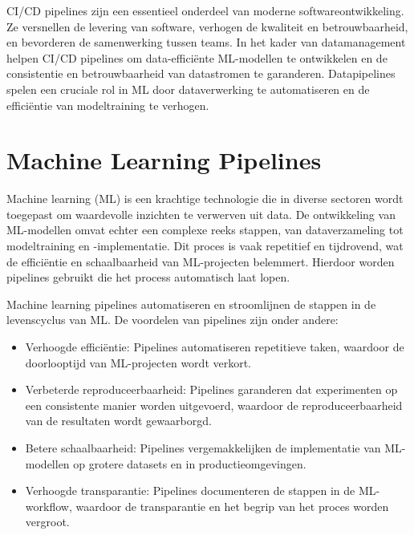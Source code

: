 CI/CD pipelines zijn een essentieel onderdeel van moderne softwareontwikkeling. Ze versnellen de levering van software, verhogen de kwaliteit en betrouwbaarheid, en bevorderen de samenwerking tussen teams. In het kader van datamanagement helpen CI/CD pipelines om data-efficiënte ML-modellen te ontwikkelen en de consistentie en betrouwbaarheid van datastromen te garanderen. Datapipelines spelen een cruciale rol in ML door dataverwerking te automatiseren en de efficiëntie van modeltraining te verhogen.
\section{Machine Learning Pipelines}

Machine learning (ML) is een krachtige technologie die in diverse sectoren wordt toegepast om waardevolle inzichten te verwerven uit data\autocite{Jordan2015}. De ontwikkeling van ML-modellen omvat echter een complexe reeks stappen, van dataverzameling tot modeltraining en -implementatie. Dit proces is vaak repetitief en tijdrovend, wat de efficiëntie en schaalbaarheid van ML-projecten belemmert. Hierdoor worden pipelines gebruikt die het process automatisch laat lopen.


Machine learning pipelines automatiseren en stroomlijnen de stappen in de levenscyclus van ML. De voordelen van pipelines zijn onder andere:
\begin{itemize}
    \item Verhoogde efficiëntie: Pipelines automatiseren repetitieve taken, waardoor de doorlooptijd van ML-projecten wordt verkort.
    \item Verbeterde reproduceerbaarheid: Pipelines garanderen dat experimenten op een consistente manier worden uitgevoerd, waardoor de reproduceerbaarheid van de resultaten wordt gewaarborgd.
    \item Betere schaalbaarheid: Pipelines vergemakkelijken de implementatie van ML-modellen op grotere datasets en in productieomgevingen.
    \item Verhoogde transparantie: Pipelines documenteren de stappen in de ML-workflow, waardoor de transparantie en het begrip van het proces worden vergroot.
\end{itemize}

